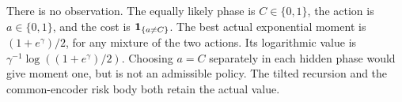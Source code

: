 \begin{example}
\label{ex:v10-phase}
There is no observation. The equally likely phase is $C\in\{0,1\}$,
the action is $a\in\{0,1\}$, and the cost is $\mathbf 1_{\{a\ne C\}}$.
The best actual exponential moment is $(1+e^\gamma)/2$, for any
mixture of the two actions. Its logarithmic value is
$\gamma^{-1}\log((1+e^\gamma)/2)$. Choosing $a=C$ separately in each
hidden phase would give moment one, but is not an admissible policy.
The tilted recursion and the common-encoder risk body both retain
the actual value.
\end{example}
